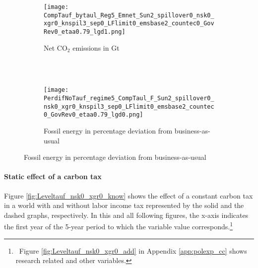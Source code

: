 \begin{figure}[h!!]
	\centering
	\caption{A constant carbon tax equal to US\$185 (2020 prices) per ton of carbon  }\label{fig:Leveltauf_nsk0_xgr0_know}		
	\begin{subfigure}[]{0.4\textwidth}
		\caption{Net CO$_2$ emissions in Gt \\ \ }
		\texttt{[image: CompTauf\_bytaul\_Reg5\_Emnet\_Sun2\_spillover0\_nsk0\_xgr0\_knspil3\_sep0\_LFlimit0\_emsbase2\_countec0\_GovRev0\_etaa0.79\_lgd1.png]}
	\end{subfigure}	
	\begin{minipage}[]{0.1\textwidth}
		\
	\end{minipage}
	\begin{subfigure}[]{0.4\textwidth}
		\caption{Fossil energy in percentage deviation from business-as-usual}
		\texttt{[image: PerdifNoTauf\_regime5\_CompTaul\_F\_Sun2\_spillover0\_nsk0\_xgr0\_knspil3\_sep0\_LFlimit0\_emsbase2\_countec0\_GovRev0\_etaa0.79\_lgd0.png]}
	\end{subfigure}
\end{figure} 

\paragraph{Static effect of a carbon tax}
Figure \ref{fig:Leveltauf_nsk0_xgr0_know} shows the effect of a constant carbon tax in a world with and without labor income tax represented by the solid and the dashed graphs, respectively. In this and all following figures, the x-axis indicates the first year of the 5-year period to which the variable value corresponds.\footnote{\ Figure \ref{fig:Leveltauf_nsk0_xgr0_add} in Appendix \ref{app:polexp_cc} shows research related and other variables.}  


